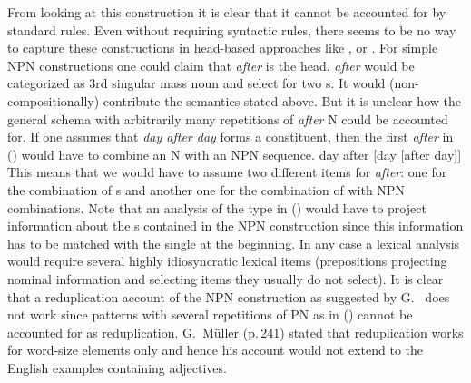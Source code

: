 \documentclass[output=paper]{langsci/langscibook}
\begin{document}

From looking at this construction it is clear that it cannot be accounted for by standard \xbar
rules. Even without requiring \xbar syntactic rules, there seems to be no way to capture these
constructions in head-based approaches like \minimalism, \cg or \dg. For simple NPN constructions
one could claim that \emph{after} is the head. \emph{after} would be categorized as 3rd singular
mass noun and select for two \nbar{}s. It would (non-compositionally) contribute the semantics stated above. But it is unclear how the general schema with arbitrarily
many repetitions of \emph{after} N could be accounted for. If one assumes that \emph{day after day}
forms a constituent, then the first \emph{after} in () would have to combine an N with an NPN sequence.
\ea
day after [day [after day]]
\z
This means that we would have to assume two different items for \emph{after}: one for the
combination of \nbar{}s and another one for the combination of \nbar with NPN combinations. Note
that an analysis of the type in () would have to project information about the \nbar{}s contained
in the NPN construction since this information has to be matched with the single \nbar at the
beginning. In any case a lexical analysis would require several highly idiosyncratic lexical items
(prepositions projecting nominal information and selecting items they usually do not select).
It is clear that a reduplication account of the NPN construction as suggested by
G.\ \citet{GMueller2011a} does not work since patterns with several repetitions of PN as in
() cannot be accounted for as reduplication. G.\ Müller (p.\,241) stated that reduplication works
for word-size elements only and hence his account would not extend to the English examples
containing adjectives.


\end{document}

